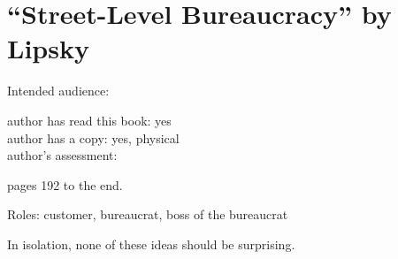 \section{``Street-Level Bureaucracy'' by Lipsky\label{review:lipsky_street}}

\cite{1983_Lipsky}

Intended audience:

author has read this book: yes\\
author has a copy: yes, physical\\
author's assessment:


pages 192 to the end.

Roles: customer, bureaucrat, boss of the bureaucrat

In isolation, none of these ideas should be surprising.
